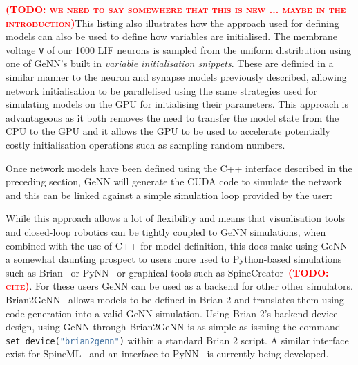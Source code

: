 \documentclass[utf8]{frontiersSCNS} %
\newcommand{\todo}[1]{\textbf{\textsc{\textcolor{red}{(TODO: #1)}}}}
\begin{document}
\todo{we need to say somewhere that this is new ... maybe in the introduction}This listing also illustrates how the approach used for defining models can also be used to define how variables are initialised.
The membrane voltage \lstinline{V} of our \num{1000} LIF neurons is sampled from the uniform distribution using one of GeNN's built in \textit{variable initialisation snippets}.
These are definied in a similar manner to the neuron and synapse models previously described, allowing network initialisation to be parallelised using the same strategies used for simulating models on the GPU for initialising their parameters.
This approach is advantageous as it both removes the need to transfer the model state from the CPU to the GPU and it allows the GPU to be used to accelerate potentially costly initialisation operations such as sampling random numbers.

Once network models have been defined using the C++ interface described in the preceding section, GeNN will generate the CUDA code to simulate the network and this can be linked against a simple simulation loop provided by the user:



While this approach allows a lot of flexibility and means that visualisation tools and closed-loop robotics can be tightly coupled to GeNN simulations, when combined with the use of C++ for model definition, this does make using GeNN a somewhat daunting prospect to users more used to Python-based simulations such as Brian~\citep{Stimberg2014} or PyNN~\citep{Davison2008a} or graphical tools such as SpineCreator~\todo{cite}.
For these users GeNN can be used as a backend for other other simulators.
Brian2GeNN~\citep{Stimberg2018} allows models to be defined in Brian 2 and translates them using code generation into a valid GeNN simulation. 
Using Brian 2's backend device design, using GeNN through Brian2GeNN is as simple as issuing the command \lstinline[language=python]{set_device("brian2genn")} within a standard Brian 2 script. 
A similar interface exist for SpineML~\citep{Richmond2014} and an interface to PyNN~\citep{Davison2008a} is currently being developed.
\end{document}
